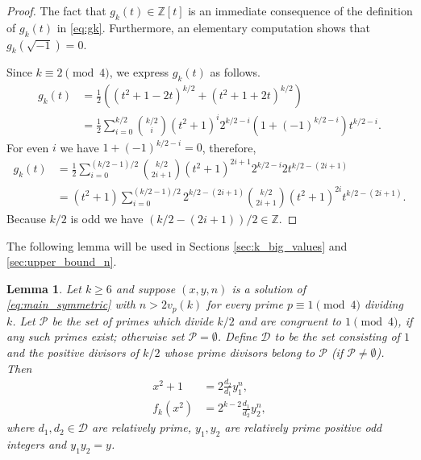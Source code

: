 \documentclass[12pt]{amsart}
\numberwithin{equation}{section}
\newtheorem{lemma}{Lemma}[section]
\theoremstyle{definition}
\theoremstyle{remark}
\newcommand{\ZZ}{\mathbb{Z}}
\newcommand{\cD}{\mathcal{D}}
\newcommand{\cP}{\mathcal{P}}
\begin{document}
\begin{proof}
The fact that $g_k(t)\in\ZZ[t]$ is an immediate consequence of the definition of $g_k(t)$ in \eqref{eq:gk}. Furthermore, an elementary computation shows that $g_k(\sqrt{-1})=0$.

Since $k\equiv 2\pmod 4$, we express $g_k(t)$ as follows. 
%
\begin{align*}
    g_k(t) & = \frac{1}{2}\left((t^2+1-2t)^{k/2}+(t^2+1+2t)^{k/2}\right) \\
    & =\frac{1}{2}\sum_{i=0}^{k/2}\binom{k/2}{i}(t^2+1)^i2^{k/2-i}
        (1+(-1)^{k/2-i})t^{k/2-i}.
\end{align*}
%
For even $i$ we have $1+(-1)^{k/2-i}=0$, therefore,  
%
\begin{align*}
    g_k(t) & = 
    \frac{1}{2}\sum_{i=0}^{(k/2-1)/2}
    \binom{k/2}{2i+1}(t^2+1)^{2i+1}2^{k/2-i}2t^{k/2-(2i+1)} \\
    & =(t^2+1)\sum_{i=0}^{(k/2-1)/2}2^{k/2-(2i+1)}
    \binom{k/2}{2i+1}(t^2+1)^{2i}t^{k/2-(2i+1)}.
\end{align*}
Because $k/2$ is odd we have $(k/2-(2i+1))/2\in\ZZ$.
\end{proof}
%
The following lemma will be used in Sections \ref{sec:k_big_values} and 
\ref{sec:upper_bound_n}.
%
\begin{lemma}\label{lem:equations_system}
Let $k\ge 6$ and suppose $(x,y,n)$ is a solution of \eqref{eq:main_symmetric} with $n>2v_p(k)$ for every prime $p\equiv 1\pmod 4$ dividing $k$. Let $\cP$ be the set of primes which divide $k/2$ and are congruent to $1\pmod 4$, if any such primes exist; otherwise set $\cP=\emptyset$. Define $\cD$ to be the set consisting of $1$ and the positive divisors of $k/2$ whose prime divisors belong to $\cP$ (if $\cP\ne\emptyset$). Then
\begin{align}
    x^2 + 1 & = 2\frac{d_2}{d_1}y_1^n,     \label{eq:express_x^2+1}
    \\
    f_k(x^2) & = 2^{k-2}\frac{d_1}{d_2}y_2^n,   \label{eq:express_f_k(x^2)}
\end{align}
where $d_1,d_2\in\cD$ are relatively prime, $y_1,y_2$ are relatively prime positive odd integers and $y_1y_2=y$.
\end{lemma}
%
\end{document}
